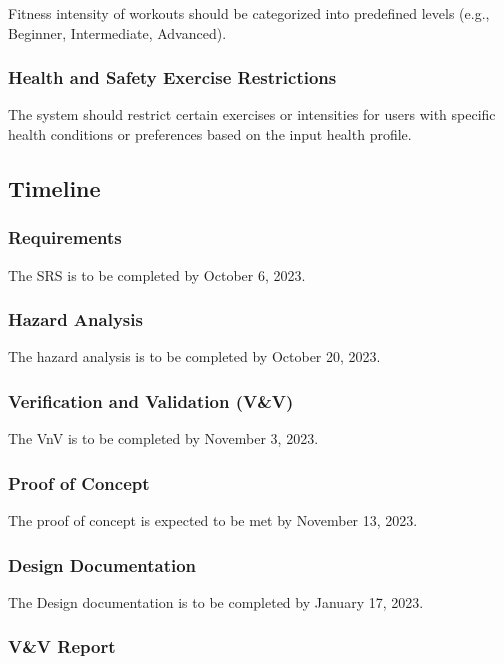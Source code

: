 \documentclass[12pt]{article}
\begin{document}
Fitness intensity of workouts should be categorized into predefined levels (e.g., Beginner, Intermediate, Advanced).

\subsubsection{Health and Safety Exercise Restrictions}

The system should restrict certain exercises or intensities for users with specific health conditions or preferences based on the input health profile.

\subsection{Timeline}

\subsubsection{Requirements}

The SRS is to be completed by October 6, 2023.

\subsubsection{Hazard Analysis}

The hazard analysis is to be completed by October 20, 2023.

\subsubsection{Verification and Validation (V&V)}

The VnV is to be completed by November 3, 2023.

\subsubsection{Proof of Concept}

The proof of concept is expected to be met by November 13, 2023.

\subsubsection{Design Documentation}

The Design documentation is to be completed by January 17, 2023.

\subsubsection{V&V Report}
\end{document}
